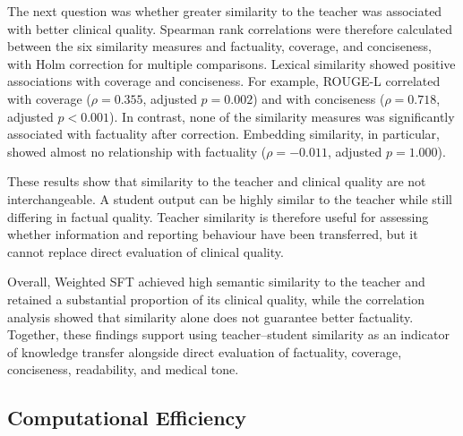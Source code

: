 \documentclass[ %
                    author={Aman Kumar Singh},
                supervisor={Dr. Edwin Simpson},
                    degree={MSc},
                     title={Quality-Aware Knowledge Distillation of Large Language Models for Efficient Personalised Clinical Report Generation},
                  subtitle={},
                      type={},
                      year={2021}]{dissertation}
\begin{document}
The next question was whether greater similarity to the teacher was
associated with better clinical quality. Spearman rank correlations were
therefore calculated between the six similarity measures and factuality,
coverage, and conciseness, with Holm correction for multiple comparisons.
Lexical similarity showed positive associations with coverage and
conciseness. For example, ROUGE-L correlated with coverage
($\rho=0.355$, adjusted $p=0.002$) and with conciseness
($\rho=0.718$, adjusted $p<0.001$). In contrast, none of the similarity
measures was significantly associated with factuality after correction.
Embedding similarity, in particular, showed almost no relationship with
factuality ($\rho=-0.011$, adjusted $p=1.000$).

These results show that similarity to the teacher and clinical quality are
not interchangeable. A student output can be highly similar to the
teacher while still differing in factual quality. Teacher similarity is
therefore useful for assessing whether information and reporting behaviour
have been transferred, but it cannot replace direct evaluation of clinical
quality.

Overall, Weighted SFT achieved high semantic similarity to the teacher and
retained a substantial proportion of its clinical quality, while the
correlation analysis showed that similarity alone does not guarantee
better factuality. Together, these findings support using teacher--student
similarity as an indicator of knowledge transfer alongside direct
evaluation of factuality, coverage, conciseness, readability, and medical
tone.

\subsection{Computational Efficiency}
\label{sec:computational_efficiency}
\end{document}
